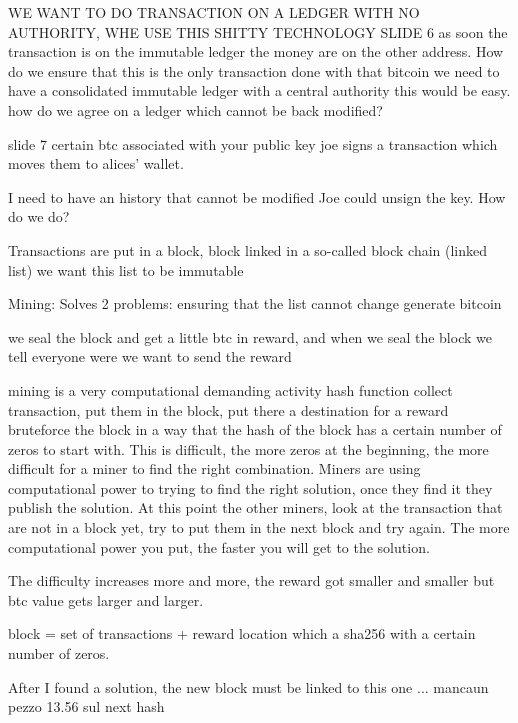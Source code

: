     WE WANT TO DO TRANSACTION ON A LEDGER WITH NO AUTHORITY, WHE USE THIS SHITTY TECHNOLOGY
SLIDE 6
    as soon the transaction is on the immutable ledger the money are on the other address.
    How do we ensure that this is the only transaction done with that bitcoin 
    we need to have a consolidated immutable ledger
    with a central authority this would be easy.
    how do we agree on a ledger which cannot be back modified?

    slide 7
        certain btc associated with your public key
        joe signs a transaction which moves them to alices' wallet.

        I need to have an history that cannot be modified
            Joe could unsign the key. How do we do?

        Transactions are put in a block, block linked in a so-called block chain (linked list)
        we want this list to be immutable

        Mining:
            Solves 2 problems:
                ensuring that the list cannot change 
                generate bitcoin

                we seal the block and get a little btc in reward, and when we seal the block we tell everyone were we want to send the reward

                mining is a very computational demanding activity
                    hash function 
                    collect transaction, put them in the block, put there a destination for a reward
                    bruteforce the block in a way that the hash of the block has a certain number of zeros to start with.
                    This is difficult, the more zeros at the beginning, the more difficult for a miner to find the right combination.
                    Miners are using computational power to trying to find the right solution, once they find it they publish the solution.
                    At this point the other miners, look at the transaction that are not in a block yet, try to put them in the next block and try again.
                    The more computational power you put, the faster you will get to the solution.

                    The difficulty increases more and more, the reward got smaller and smaller but btc value gets larger and larger.

                    block = set of transactions + reward location which a sha256 with a certain number of zeros.

                    After I found a solution, the new block must be linked to this one ... mancaun pezzo 13.56 sul next hash 


